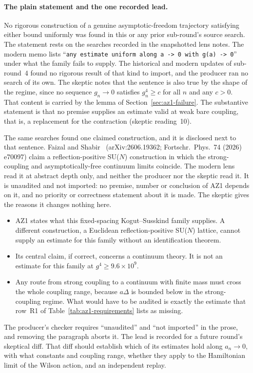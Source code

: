 \paragraph{The plain statement and the one recorded lead.}
No rigorous construction of a genuine asymptotic-freedom trajectory
satisfying either bound uniformly was found in this or any prior sub-round's
source search. The statement rests on the searches recorded in the
snapshotted lens notes. The modern memo lists
``\texttt{any estimate uniform along a -> 0 with g(a) -> 0}'' under what the
family fails to supply. The historical
and modern updates of sub-round~4 found no rigorous result of that kind to
import, and the producer ran no search of its own. The skeptic notes that the
sentence is also true by the shape of the regime, since no sequence
$g_n\to0$ satisfies $g_n^4\ge c$ for all $n$ and any $c>0$. That content is
carried by the lemma of Section~\ref{sec:az1-failure}. The substantive
statement is that no premise supplies an estimate valid at weak bare
coupling, that is, a replacement for the contraction (skeptic reading~10).

The same searches found one claimed construction, and it is disclosed next to
that sentence. Faizal and Shabir~\cite{faizal} (arXiv:2606.19362;
Fortschr.\ Phys.\ 74 (2026) e70097) claim a reflection-positive SU($N$)
construction in which the strong-coupling and asymptotically-free continuum
limits coincide. The modern lens read it at abstract depth only, and neither
the producer nor the skeptic read it. It is unaudited and not imported: no
premise, number or conclusion of AZ1 depends on it, and no priority or
correctness statement about it is made. The skeptic gives the reasons it
changes nothing here.
\begin{itemize}
\item AZ1 states what this fixed-spacing Kogut--Susskind family supplies. A
 different construction, a Euclidean reflection-positive SU($N$) lattice,
 cannot supply an estimate for this family without an identification
 theorem.
\item Its central claim, if correct, concerns a continuum theory. It is not
 an estimate for this family at $g^4\ge9.6\times10^9$.
\item Any route from strong coupling to a continuum with finite mass must
 cross the whole coupling range, because $a\Delta$ is bounded below in the
 strong-coupling regime. What would have to be audited is exactly the
 estimate that row~R1 of Table~\ref{tab:az1-requirements} lists as missing.
\end{itemize}
The producer's checker requires ``unaudited'' and ``not imported'' in the
prose, and removing the paragraph aborts it. The lead is recorded for a
future round's skeptical diff. That diff should establish which of its
estimates hold along $a_n\to0$, with what constants and coupling range,
whether they apply to the Hamiltonian limit of the Wilson action, and an
independent replay.

